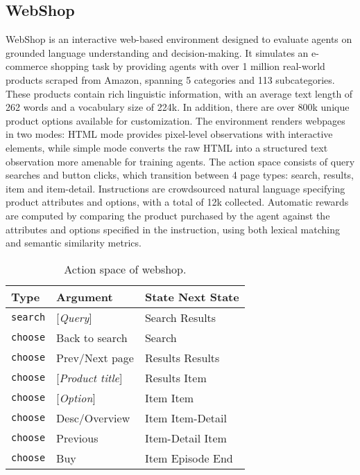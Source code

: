 \documentclass{article} \usepackage{iclr2024_conference,times}
\begin{document}
\subsection{WebShop}

WebShop \citep{yao2022webshop} is an interactive web-based environment designed to evaluate agents on grounded language understanding and decision-making. It simulates an e-commerce shopping task by providing agents with over 1 million real-world products scraped from Amazon, spanning 5 categories and 113 subcategories. These products contain rich linguistic information, with an average text length of 262 words and a vocabulary size of 224k. In addition, there are over 800k unique product options available for customization. The environment renders webpages in two modes: HTML mode provides pixel-level observations with interactive elements, while simple mode converts the raw HTML into a structured text observation more amenable for training agents. The action space consists of query searches and button clicks, which transition between 4 page types: search, results, item and item-detail. Instructions are crowdsourced natural language specifying product attributes and options, with a total of 12k collected. Automatic rewards are computed by comparing the product purchased by the agent against the attributes and options specified in the instruction, using both lexical matching and semantic similarity metrics. 
\\

\begin{table}[ht]
    \centering
\begin{tabular}{lll}
\toprule
     Type &  Argument &  State  Next State \\
\midrule
    \texttt{search} & [\textit{Query}] & Search  Results\\ 
    \texttt{choose} & Back to search &   Search\\
    \texttt{choose} & Prev/Next page & Results  Results\\
    \texttt{choose} & [\textit{Product title}] & Results  Item\\
    \texttt{choose} & [\textit{Option}] & Item  Item\\
    \texttt{choose} & Desc/Overview & Item  Item-Detail\\
    \texttt{choose} & Previous & Item-Detail  Item\\
    \texttt{choose} & Buy & Item  Episode End\\
\bottomrule
\end{tabular}
\vspace{5pt}
\caption{Action space of webshop.}
\label{table:action_space_}
\end{table}
\end{document}

